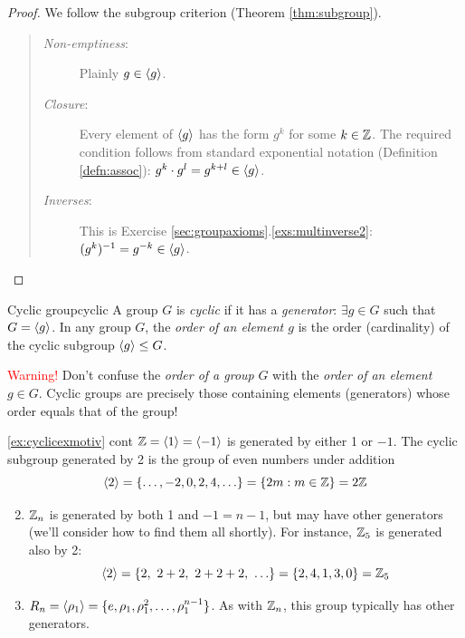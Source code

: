 \begin{proof}
	We follow the subgroup criterion (Theorem \ref{thm:subgroup}).
	\begin{quote}
		\begin{description}
			\item[\emph{Non-emptiness}:] Plainly $g\in\left\langle g\right\rangle$.
			\item[\emph{Closure}:] Every element of $\left\langle g\right\rangle$ has the form $g^k$ for some $k\in \mathbb{Z}$. The required condition follows from standard exponential notation (Definition \ref{defn:assoc}): $g^k\cdot g^l=g^{k+l}\in\left\langle g\right\rangle$.
			\item[\emph{Inverses}:] This is Exercise \ref*{sec:groupaxioms}.\ref{exs:multinverse2}: $(g^k)^{-1}=g^{-k}\in\left\langle g\right\rangle$.
		\end{description}
	\end{quote}
	\vspace{-18pt}
\end{proof}

\begin{defn}{Cyclic group}{cyclic}
	A group $G$ is \emph{cyclic} if it has a \emph{generator}: $\exists g\in G$ such that $G=\left\langle g\right\rangle$.\smallbreak
	In any group $G$, the \emph{order of an element $g$} is the order (cardinality) of the cyclic subgroup $\left\langle g\right\rangle\le G$.
\end{defn}

\textcolor{red}{Warning!} Don't confuse the \emph{order of a group} $G$ with the \emph{order of an element} $g\in G$. Cyclic groups are precisely those containing elements (generators) whose order equals that of the group!


\goodbreak


\begin{examples*}{\ref{ex:cyclicexmotiv} cont}{}
	\exstart $\mathbb{Z}=\left\langle 1\right\rangle=\left\langle -1\right\rangle$ is generated by either 1 or $-1$. The cyclic subgroup generated by 2 is the group of even numbers under addition
	\[
		\left\langle 2\right\rangle=\{\ldots,-2,0,2,4,\ldots\}=\{2m:m\in\mathbb{Z}\}=2\mathbb{Z}
	\]
	\begin{enumerate}\setcounter{enumi}{1}
	  \item $\mathbb{Z}_n$ is generated by both 1 and $-1=n-1$, but may have other generators (we'll consider how to find them all shortly). For instance, $\mathbb{Z}_5$ is generated also by 2:
	  \[
	  	\ip 2=\{2,\ 2+2,\ 2+2+2,\ \ldots\}=\{2, 4, 1, 3, 0\} =\Z_5
	  \]
		\item $R_n=\left\langle \rho_1\right\rangle=\{e,\rho_1,\rho_1^2,\ldots,\rho_1^{n-1}\}$. As with $\mathbb{Z}_n$, this group typically has other generators.
	\end{enumerate}
\end{examples*}

